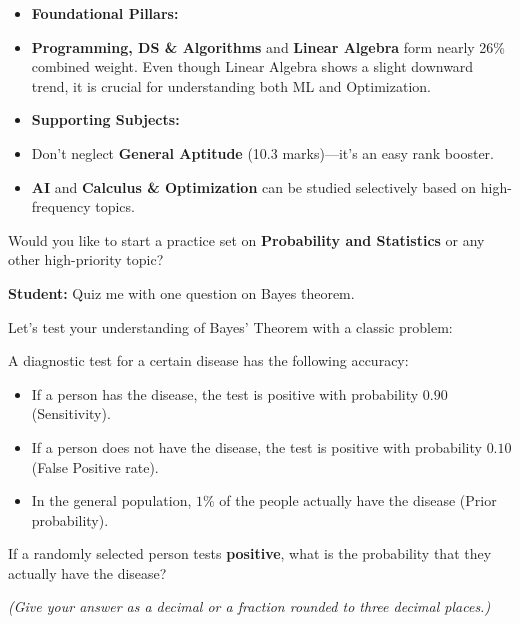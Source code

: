 \begin{tcolorbox}[enhanced,breakable,colback=blue!3,colframe=blue!30,boxrule=0.4pt,arc=2pt,left=6pt,right=6pt,title={PaperMind},fonttitle=\bfseries\small,coltitle=black,colbacktitle=blue!10]
\begin{itemize}[leftmargin=1.4em,itemsep=1pt]
\item \textbf{Foundational Pillars:}
\item \textbf{Programming, DS \& Algorithms} and \textbf{Linear Algebra} form nearly 26\% combined weight. Even though Linear Algebra shows a slight downward trend, it is crucial for understanding both ML and Optimization.
\end{itemize}
\begin{itemize}[leftmargin=1.4em,itemsep=1pt]
\item \textbf{Supporting Subjects:}
\item Don't neglect \textbf{General Aptitude} (10.3 marks)—it's an easy rank booster. 
\item \textbf{AI} and \textbf{Calculus \& Optimization} can be studied selectively based on high-frequency topics.
\end{itemize}
Would you like to start a practice set on \textbf{Probability and Statistics} or any other high-priority topic?\par
\end{tcolorbox}

\par\noindent\textbf{Student:} Quiz me with one question on Bayes theorem.\par\smallskip

\begin{tcolorbox}[enhanced,breakable,colback=blue!3,colframe=blue!30,boxrule=0.4pt,arc=2pt,left=6pt,right=6pt,title={PaperMind},fonttitle=\bfseries\small,coltitle=black,colbacktitle=blue!10]
\small Let's test your understanding of Bayes' Theorem with a classic problem:\par
A diagnostic test for a certain disease has the following accuracy:\par
\begin{itemize}[leftmargin=1.4em,itemsep=1pt]
\item If a person has the disease, the test is positive with probability $0.90$ (Sensitivity).
\item If a person does not have the disease, the test is positive with probability $0.10$ (False Positive rate).
\item In the general population, $1\%$ of the people actually have the disease (Prior probability).
\end{itemize}
If a randomly selected person tests \textbf{positive}, what is the probability that they actually have the disease? \par
\emph{(Give your answer as a decimal or a fraction rounded to three decimal places.)}\par
\end{tcolorbox}

